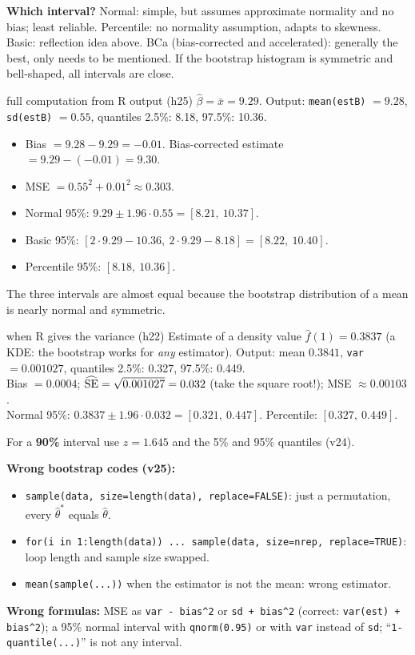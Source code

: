 \textbf{Which interval?} Normal: simple, but assumes approximate normality and no bias; least reliable. Percentile: no normality assumption, adapts to skewness. Basic: reflection idea above. BCa (bias-corrected and accelerated): generally the best, only needs to be mentioned. If the bootstrap histogram is symmetric and bell-shaped, all intervals are close.

\begin{example}{full computation from R output (h25)}
$\hat\beta = \bar x = 9.29$. Output: \texttt{mean(estB)} $=9.28$, \texttt{sd(estB)} $=0.55$, quantiles 2.5\%: 8.18, 97.5\%: 10.36.
\begin{itemize}
  \item Bias $= 9.28-9.29 = -0.01$. Bias-corrected estimate $= 9.29-(-0.01) = 9.30$.
  \item MSE $=0.55^2+0.01^2\approx0.303$.
  \item Normal 95\%: $9.29\pm1.96\cdot0.55 = [8.21,\ 10.37]$.
  \item Basic 95\%: $[2\cdot9.29-10.36,\ 2\cdot9.29-8.18] = [8.22,\ 10.40]$.
  \item Percentile 95\%: $[8.18,\ 10.36]$.
\end{itemize}
The three intervals are almost equal because the bootstrap distribution of a mean is nearly normal and symmetric.
\end{example}

\begin{example}{when R gives the variance (h22)}
Estimate of a density value $\hat f(1) = 0.3837$ (a KDE: the bootstrap works for \emph{any} estimator). Output: mean $0.3841$, \texttt{var} $=0.001027$, quantiles 2.5\%: 0.327, 97.5\%: 0.449.\\
Bias $=0.0004$; $\widehat{\mathrm{SE}} = \sqrt{0.001027} = 0.032$ (take the square root!); MSE $\approx0.00103$.\\
Normal 95\%: $0.3837\pm1.96\cdot0.032 = [0.321,\ 0.447]$. Percentile: $[0.327,\ 0.449]$.
\end{example}

For a \textbf{90\%} interval use $z = 1.645$ and the 5\% and 95\% quantiles (v24).

\begin{traps}
\textbf{Wrong bootstrap codes (v25):}
\begin{itemize}
  \item \texttt{sample(data, size=length(data), replace=FALSE)}: just a permutation, every $\hat\theta^*$ equals $\hat\theta$.
  \item \texttt{for(i in 1:length(data)) ... sample(data, size=nrep, replace=TRUE)}: loop length and sample size swapped.
  \item \texttt{mean(sample(...))} when the estimator is not the mean: wrong estimator.
\end{itemize}
\textbf{Wrong formulas:} MSE as \texttt{var - bias\^{}2} or \texttt{sd + bias\^{}2} (correct: \texttt{var(est) + bias\^{}2}); a 95\% normal interval with \texttt{qnorm(0.95)} or with \texttt{var} instead of \texttt{sd}; ``\texttt{1-quantile(...)}'' is not any interval.
\end{traps}

